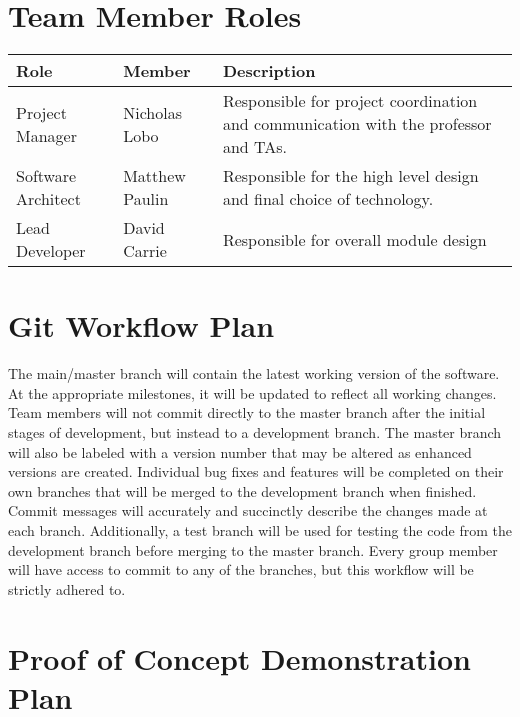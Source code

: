 \documentclass{article}
\begin{document}
\newpage
\section{Team Member Roles}

\begin{longtable}{| p{}|p{}| 
p{} |}
    \hline
    Role & Member & Description \\
    \hline
    Project Manager & Nicholas Lobo & Responsible for project coordination and communication with the professor and TAs. \\
    \hline
    Software Architect & Matthew Paulin & Responsible for the high level design and final choice of technology.  \\
    \hline
    Lead Developer & David Carrie & Responsible for overall module design\\
    \hline
\end{longtable}
\section{Git Workflow Plan}
The main/master branch will contain the latest working version of the software. At the appropriate milestones, it will be updated to reflect all working changes. Team members will not commit directly to the master branch after the initial stages of development, but instead to a development branch. The master branch will also be labeled with a version number that may be altered as enhanced versions are created. Individual bug fixes and features will be completed on their own branches that will be merged to the development branch when finished. Commit messages will accurately and succinctly describe the changes made at each branch. Additionally, a test branch will be used for testing the code from the development branch before merging to the master branch. Every group member will have access to commit to any of the branches, but this workflow will be strictly adhered to.

\section{Proof of Concept Demonstration Plan}
\end{document}
